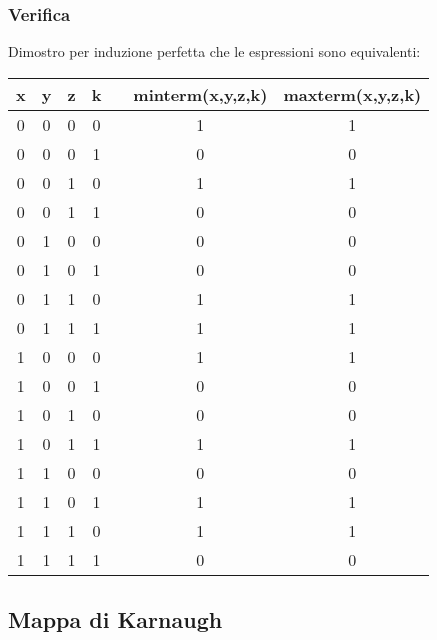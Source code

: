 \documentclass{article}
\begin{document}
\subsubsection*{Verifica}
Dimostro per induzione perfetta che le espressioni sono equivalenti:

\begin{center}
  \begin{tabular}{|c|c|c|c|c|c|c|}
    \hline
    \textbf{x} & \textbf{y} & \textbf{z} & \textbf{k} & \quad\quad\quad & \textbf{minterm(x,y,z,k)} & \textbf{maxterm(x,y,z,k)} \\
    \hline
      0 & 0 & 0 & 0 & \quad\quad\quad & 1 & 1 \\
    \hline
      0 & 0 & 0 & 1 & \quad\quad\quad & 0 & 0 \\
    \hline
      0 & 0 & 1 & 0 & \quad\quad\quad & 1 & 1 \\
    \hline
      0 & 0 & 1 & 1 & \quad\quad\quad & 0 & 0 \\
    \hline
      0 & 1 & 0 & 0 & \quad\quad\quad & 0 & 0 \\
    \hline
      0 & 1 & 0 & 1 & \quad\quad\quad & 0 & 0 \\
    \hline
      0 & 1 & 1 & 0 & \quad\quad\quad & 1 & 1 \\
    \hline
      0 & 1 & 1 & 1 & \quad\quad\quad & 1 & 1 \\
    \hline
      1 & 0 & 0 & 0 & \quad\quad\quad & 1 & 1 \\
    \hline
      1 & 0 & 0 & 1 & \quad\quad\quad & 0 & 0 \\
    \hline
      1 & 0 & 1 & 0 & \quad\quad\quad & 0 & 0 \\
    \hline
      1 & 0 & 1 & 1 & \quad\quad\quad & 1 & 1 \\
    \hline
      1 & 1 & 0 & 0 & \quad\quad\quad & 0 & 0 \\
    \hline
      1 & 1 & 0 & 1 & \quad\quad\quad & 1 & 1 \\
    \hline
      1 & 1 & 1 & 0 & \quad\quad\quad & 1 & 1 \\
    \hline
      1 & 1 & 1 & 1 & \quad\quad\quad & 0 & 0 \\
    \hline
  \end{tabular}
\end{center}

\subsection*{Mappa di Karnaugh}
\end{document}
